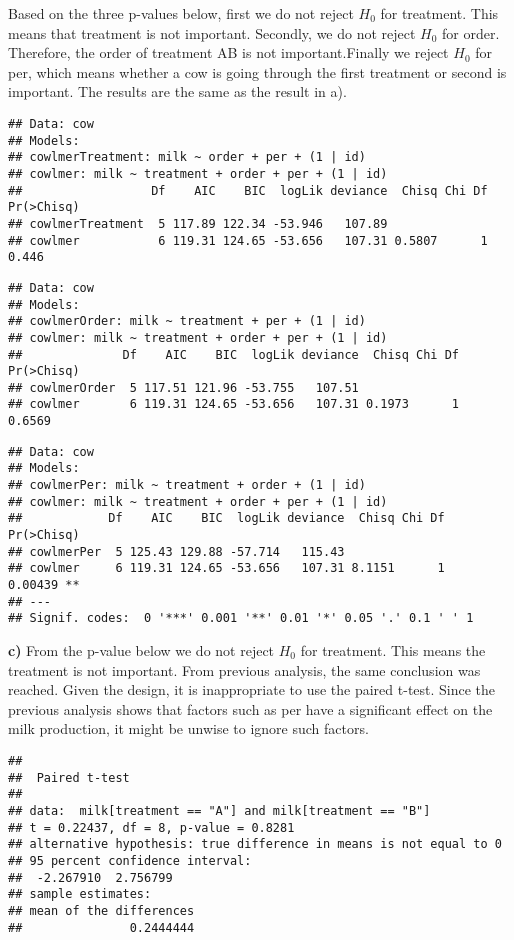 \documentclass[]{article}
\begin{document}
Based on the three p-values below, first we do not reject \(H_0\) for
treatment. This means that treatment is not important. Secondly, we do
not reject \(H_0\) for order. Therefore, the order of treatment AB is
not important.Finally we reject \(H_0\) for per, which means whether a
cow is going through the first treatment or second is important. The
results are the same as the result in a).

\begin{verbatim}
## Data: cow
## Models:
## cowlmerTreatment: milk ~ order + per + (1 | id)
## cowlmer: milk ~ treatment + order + per + (1 | id)
##                  Df    AIC    BIC  logLik deviance  Chisq Chi Df Pr(>Chisq)
## cowlmerTreatment  5 117.89 122.34 -53.946   107.89                         
## cowlmer           6 119.31 124.65 -53.656   107.31 0.5807      1      0.446
\end{verbatim}

\begin{verbatim}
## Data: cow
## Models:
## cowlmerOrder: milk ~ treatment + per + (1 | id)
## cowlmer: milk ~ treatment + order + per + (1 | id)
##              Df    AIC    BIC  logLik deviance  Chisq Chi Df Pr(>Chisq)
## cowlmerOrder  5 117.51 121.96 -53.755   107.51                         
## cowlmer       6 119.31 124.65 -53.656   107.31 0.1973      1     0.6569
\end{verbatim}

\begin{verbatim}
## Data: cow
## Models:
## cowlmerPer: milk ~ treatment + order + (1 | id)
## cowlmer: milk ~ treatment + order + per + (1 | id)
##            Df    AIC    BIC  logLik deviance  Chisq Chi Df Pr(>Chisq)   
## cowlmerPer  5 125.43 129.88 -57.714   115.43                            
## cowlmer     6 119.31 124.65 -53.656   107.31 8.1151      1    0.00439 **
## ---
## Signif. codes:  0 '***' 0.001 '**' 0.01 '*' 0.05 '.' 0.1 ' ' 1
\end{verbatim}

\textbf{c)} From the p-value below we do not reject \(H_0\) for
treatment. This means the treatment is not important. From previous
analysis, the same conclusion was reached. Given the design, it is
inappropriate to use the paired t-test. Since the previous analysis
shows that factors such as per have a significant effect on the milk
production, it might be unwise to ignore such factors.

\begin{verbatim}
## 
##  Paired t-test
## 
## data:  milk[treatment == "A"] and milk[treatment == "B"]
## t = 0.22437, df = 8, p-value = 0.8281
## alternative hypothesis: true difference in means is not equal to 0
## 95 percent confidence interval:
##  -2.267910  2.756799
## sample estimates:
## mean of the differences 
##               0.2444444
\end{verbatim}
\end{document}
